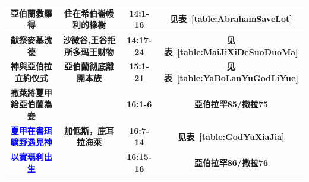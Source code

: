 \begin{table}[!hbp]
\begin{threeparttable}
\begin{tabular}{c c c c}
\multicolumn{1}{L{\dimexpr0.25\linewidth-1\tabcolsep\relax}}{\bfseries 亞伯蘭救羅得} 
& \multicolumn{1}{L{\dimexpr0.3\linewidth-1\tabcolsep\relax}}{\bfseries 住在希伯崙幔利的橡樹}  
& \multicolumn{1}{L{\dimexpr0.1\linewidth-1\tabcolsep\relax}}{\bfseries 14:1-16}
& \multicolumn{1}{L{\dimexpr0.2\linewidth-1\tabcolsep\relax}}{\bfseries 见表~\ref{table:AbrahamSaveLot}}\\\hline

\multicolumn{1}{L{\dimexpr0.25\linewidth-1\tabcolsep\relax}}{\bfseries 献祭麥基洗德} 
& \multicolumn{1}{L{\dimexpr0.3\linewidth-1\tabcolsep\relax}}{\bfseries 沙微谷,王谷拒所多玛王财物}  
& \multicolumn{1}{L{\dimexpr0.1\linewidth-1\tabcolsep\relax}}{\bfseries 14:17-24}
& \multicolumn{1}{L{\dimexpr0.2\linewidth-1\tabcolsep\relax}}{\bfseries 见表~\ref{table:MaiJiXiDeSuoDuoMa} }\\

\multicolumn{1}{L{\dimexpr0.25\linewidth-1\tabcolsep\relax}}{\bfseries 神與亞伯拉立約仪式} 
& \multicolumn{1}{L{\dimexpr0.2\linewidth-1\tabcolsep\relax}}{\bfseries 亞伯蘭彻底離開本族}  
& \multicolumn{1}{L{\dimexpr0.1\linewidth-1\tabcolsep\relax}}{\bfseries 15:1-21}
& \multicolumn{1}{L{\dimexpr0.2\linewidth-1\tabcolsep\relax}}{\bfseries 见表~\ref{table:YaBoLanYuGodLiYue}}\\

\multicolumn{1}{L{\dimexpr0.25\linewidth-1\tabcolsep\relax}}{\bfseries 撒萊將夏甲給亞伯蘭為妾}  
& \multicolumn{1}{L{\dimexpr0.2\linewidth-1\tabcolsep\relax}}{\bfseries } 
& \multicolumn{1}{L{\dimexpr0.1\linewidth-1\tabcolsep\relax}}{\bfseries 16:1-6}
& \multicolumn{1}{L{\dimexpr0.2\linewidth-1\tabcolsep\relax}}{\bfseries 亞伯拉罕85/撒拉75}\\

\multicolumn{1}{L{\dimexpr0.25\linewidth-1\tabcolsep\relax}}{\bfseries \textcolor{blue}{夏甲在書珥曠野遇見神}}  
& \multicolumn{1}{L{\dimexpr0.2\linewidth-1\tabcolsep\relax}}{\bfseries 加低斯，庇耳拉海萊} 
& \multicolumn{1}{L{\dimexpr0.1\linewidth-1\tabcolsep\relax}}{\bfseries 16:7-14}
& \multicolumn{1}{L{\dimexpr0.2\linewidth-1\tabcolsep\relax}}{\bfseries 见表~\ref{table:GodYuXiaJia}}\\

\multicolumn{1}{L{\dimexpr0.25\linewidth-1\tabcolsep\relax}}{\bfseries \textcolor{blue}{以實瑪利出生}}
& \multicolumn{1}{L{\dimexpr0.2\linewidth-1\tabcolsep\relax}}{\bfseries }   
& \multicolumn{1}{L{\dimexpr0.1\linewidth-1\tabcolsep\relax}}{\bfseries 16:15-16}
& \multicolumn{1}{L{\dimexpr0.2\linewidth-1\tabcolsep\relax}}{\bfseries 亞伯拉罕86/撒拉76}\\


\end{tabular}
\end{threeparttable}
\end{table}
